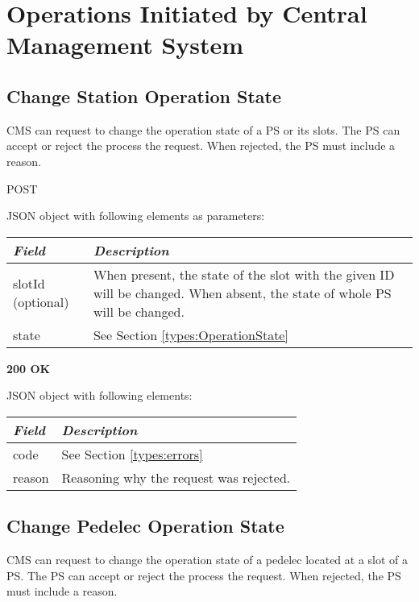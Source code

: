 \section{Operations Initiated by Central Management System}

\subsection{Change Station Operation State}

\acs{CMS} can request to change the operation state of a \acs{PS} or its slots. The \acs{PS} can accept or reject the process the request. When rejected, the \acs{PS} must include a reason.


 POST

JSON object with following elements as parameters:\\
\begin{tabularx}{\linewidth}{ | l | X | }
  \hline
  \textit{Field} & \textit{Description} \\
  \hline \hline
  slotId (optional) 		& When present, the state of the slot with the given ID will be changed. When absent, the state of whole \acs{PS} will be changed. \\
  state 					& See Section \ref{types:OperationState} \\
    \hline
\end{tabularx}

 \textbf{200 OK}

JSON object with following elements:\\
\begin{tabularx}{\linewidth}{ | l | X | }
  \hline
  \textit{Field} & \textit{Description} \\
  \hline \hline
  code 			& See Section \ref{types:errors} \\
  reason 		& Reasoning why the request was rejected. \\
    \hline
\end{tabularx}

\subsection{Change Pedelec Operation State}

\acs{CMS} can request to change the operation state of a pedelec located at a slot of a \acs{PS}. The \acs{PS} can accept or reject the process the request. When rejected, the \acs{PS} must include a reason.

